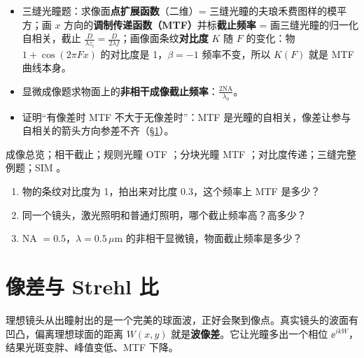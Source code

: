 \pkao
\begin{itemize}
\item 三缝光瞳题：求像面\textbf{点扩展函数}（二维）= 三缝光瞳的夫琅禾费图样的模平方；画 $x$ 方向的\textbf{调制传递函数（MTF）}并标\textbf{截止频率} = 画三缝光瞳的归一化自相关，截止 $\frac{D}{\lambda z_i}=\frac{D}{2\lambda f}$；画像面条纹\textbf{对比度} $K$ 随 $F$ 的变化：物 $1+\cos(2\pi Fx)$ 的对比度是 1，$\beta=-1$ 频率不变，所以 $K(F)$ 就是 MTF 曲线本身。
\item 显微成像题求物面上的\textbf{非相干成像截止频率}：$\frac{2\mathrm{NA}}{\lambda_0}$。
\item 证明“有像差时 MTF 不大于无像差时”：MTF 是光瞳的自相关，像差让参与自相关的箭头方向参差不齐（§\ref{sec:p-aberr}）。
\end{itemize}

\psee 成像总览\pageref{ch:imaging}；相干截止\pageref{sec:typeA}；规则光瞳 OTF \pageref{sec:typeB}；分块光瞳 MTF \pageref{sec:typeC}；对比度传递\pageref{sec:typeE}；三缝完整例题\pageref{ex:3slit}；SIM \pageref{sec:sim}。

\begin{enumerate}[label=\arabic*.]
\item 物的条纹对比度为 1，拍出来对比度 0.3，这个频率上 MTF 是多少？
\item 同一个镜头，激光照明和普通灯照明，哪个截止频率高？高多少？
\item NA $=0.5$，$\lambda=0.5\,\mu$m 的非相干显微镜，物面截止频率是多少？
\end{enumerate}

\section{像差与 Strehl 比}\label{sec:p-aberr}

\begin{idea}[一句话]
理想镜头从出瞳射出的是一个完美的球面波，正好会聚到像点。真实镜头的波面有凹凸，偏离理想球面的距离 $W(x,y)$ 就是\textbf{波像差}。它让光瞳多出一个相位 $\ee^{ikW}$，结果光斑变胖、峰值变低、MTF 下降。
\end{idea}

